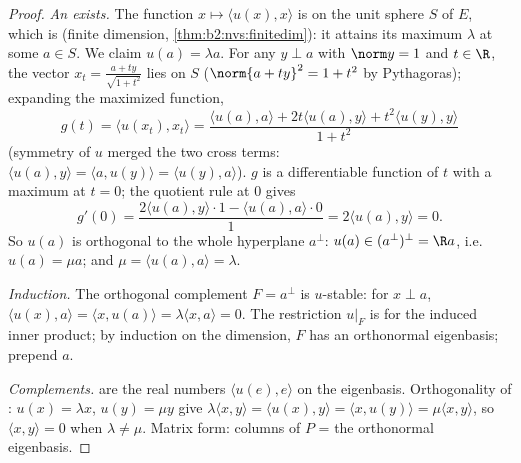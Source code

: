 \begin{proof}
\emph{An  exists.} The function $x \mapsto \langle u(x),
x\rangle$ is  on the unit sphere $S$ of $E$, which is
 (finite dimension, \cref{thm:b2:nvs:finitedim}): it attains
its maximum $\lambda$ at some $a \in S$. We claim $u(a) = \lambda
a$. For any $y \perp a$ with $\norm y = 1$ and $t \in \R$, the
vector $x_t = \frac{a + ty}{\sqrt{1 + t^2}}$ lies on $S$
($\norm{a + ty}^2 = 1 + t^2$ by Pythagoras); expanding
the maximized function,
\[
g(t) = \langle u(x_t), x_t\rangle
= \frac{\langle u(a), a\rangle + 2t\langle u(a), y\rangle +
t^2\langle u(y), y\rangle}{1 + t^2}
\]
(symmetry of $u$ merged the two cross terms: $\langle u(a),
y\rangle = \langle a, u(y)\rangle = \langle u(y), a\rangle$).
$g$ is a differentiable function of $t$ with a maximum at $t =
0$; the quotient rule at $0$ gives
\[
g'(0) = \frac{2\langle u(a), y\rangle\cdot 1 - \langle u(a),
a\rangle\cdot 0}{1} = 2\langle u(a), y\rangle = 0 .
\]
So $u(a)$ is orthogonal to the whole hyperplane $a^\perp$: $u(a)
\in (a^{\perp})^{\perp} = \R a$, i.e.\ $u(a) = \mu a$; and $\mu =
\langle u(a), a\rangle = \lambda$.

\emph{Induction.} The orthogonal complement $F = a^\perp$ is
$u$-stable: for $x \perp a$, $\langle u(x), a\rangle = \langle x,
u(a)\rangle = \lambda\langle x, a\rangle = 0$. The restriction
$u|_F$ is  for the induced inner product; by induction on
the dimension, $F$ has an orthonormal eigenbasis; prepend $a$.

\emph{Complements.}  are the real numbers $\langle u(e),
e\rangle$ on the eigenbasis. Orthogonality of : $u(x) =
\lambda x$, $u(y) = \mu y$ give $\lambda\langle x, y\rangle =
\langle u(x), y\rangle = \langle x, u(y)\rangle = \mu\langle x,
y\rangle$, so $\langle x, y\rangle = 0$ when $\lambda \neq \mu$.
Matrix form: columns of $P$ = the orthonormal eigenbasis.
\end{proof}


